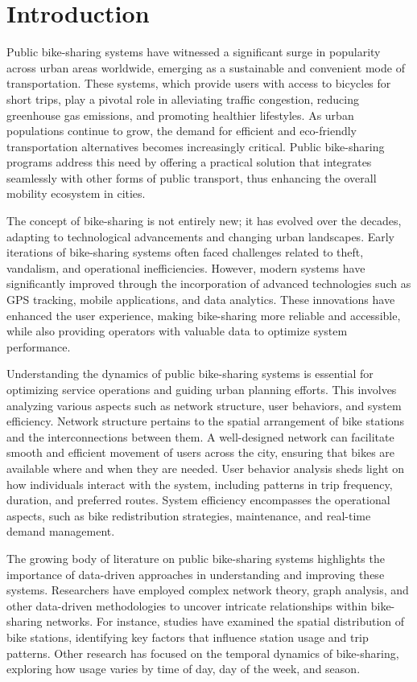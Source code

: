 \documentclass[conference]{IEEEtran}
\begin{document}
\section{Introduction}
Public bike-sharing systems have witnessed a significant surge in popularity across urban areas worldwide, emerging as a sustainable and convenient mode of transportation. These systems, which provide users with access to bicycles for short trips, play a pivotal role in alleviating traffic congestion, reducing greenhouse gas emissions, and promoting healthier lifestyles. As urban populations continue to grow, the demand for efficient and eco-friendly transportation alternatives becomes increasingly critical. Public bike-sharing programs address this need by offering a practical solution that integrates seamlessly with other forms of public transport, thus enhancing the overall mobility ecosystem in cities.

The concept of bike-sharing is not entirely new; it has evolved over the decades, adapting to technological advancements and changing urban landscapes. Early iterations of bike-sharing systems often faced challenges related to theft, vandalism, and operational inefficiencies. However, modern systems have significantly improved through the incorporation of advanced technologies such as GPS tracking, mobile applications, and data analytics. These innovations have enhanced the user experience, making bike-sharing more reliable and accessible, while also providing operators with valuable data to optimize system performance.

Understanding the dynamics of public bike-sharing systems is essential for optimizing service operations and guiding urban planning efforts. This involves analyzing various aspects such as network structure, user behaviors, and system efficiency. Network structure pertains to the spatial arrangement of bike stations and the interconnections between them. A well-designed network can facilitate smooth and efficient movement of users across the city, ensuring that bikes are available where and when they are needed. User behavior analysis sheds light on how individuals interact with the system, including patterns in trip frequency, duration, and preferred routes. System efficiency encompasses the operational aspects, such as bike redistribution strategies, maintenance, and real-time demand management.

The growing body of literature on public bike-sharing systems highlights the importance of data-driven approaches in understanding and improving these systems. Researchers have employed complex network theory, graph analysis, and other data-driven methodologies to uncover intricate relationships within bike-sharing networks. For instance, studies have examined the spatial distribution of bike stations, identifying key factors that influence station usage and trip patterns. Other research has focused on the temporal dynamics of bike-sharing, exploring how usage varies by time of day, day of the week, and season.
\end{document}
